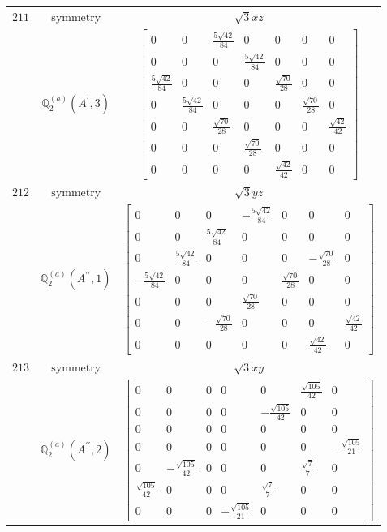 \documentclass[fleqn,8pt,landscape]{jsarticle}
\begin{document}
\begin{longtable}{ccc}
$ 211 $ & $ \text{symmetry} $ & $ \sqrt{3} x z $ \\
$  $ & $ \mathbb{Q}_{2}^{(a)}(A^{\prime},3) $ & $ \begin{bmatrix} 0 & 0 & \frac{5 \sqrt{42}}{84} & 0 & 0 & 0 & 0 \\ 0 & 0 & 0 & \frac{5 \sqrt{42}}{84} & 0 & 0 & 0 \\ \frac{5 \sqrt{42}}{84} & 0 & 0 & 0 & \frac{\sqrt{70}}{28} & 0 & 0 \\ 0 & \frac{5 \sqrt{42}}{84} & 0 & 0 & 0 & \frac{\sqrt{70}}{28} & 0 \\ 0 & 0 & \frac{\sqrt{70}}{28} & 0 & 0 & 0 & \frac{\sqrt{42}}{42} \\ 0 & 0 & 0 & \frac{\sqrt{70}}{28} & 0 & 0 & 0 \\ 0 & 0 & 0 & 0 & \frac{\sqrt{42}}{42} & 0 & 0 \end{bmatrix} $ \\ \hline
$ 212 $ & $ \text{symmetry} $ & $ \sqrt{3} y z $ \\
$  $ & $ \mathbb{Q}_{2}^{(a)}(A^{\prime\prime},1) $ & $ \begin{bmatrix} 0 & 0 & 0 & - \frac{5 \sqrt{42}}{84} & 0 & 0 & 0 \\ 0 & 0 & \frac{5 \sqrt{42}}{84} & 0 & 0 & 0 & 0 \\ 0 & \frac{5 \sqrt{42}}{84} & 0 & 0 & 0 & - \frac{\sqrt{70}}{28} & 0 \\ - \frac{5 \sqrt{42}}{84} & 0 & 0 & 0 & \frac{\sqrt{70}}{28} & 0 & 0 \\ 0 & 0 & 0 & \frac{\sqrt{70}}{28} & 0 & 0 & 0 \\ 0 & 0 & - \frac{\sqrt{70}}{28} & 0 & 0 & 0 & \frac{\sqrt{42}}{42} \\ 0 & 0 & 0 & 0 & 0 & \frac{\sqrt{42}}{42} & 0 \end{bmatrix} $ \\ \hline
$ 213 $ & $ \text{symmetry} $ & $ \sqrt{3} x y $ \\
$  $ & $ \mathbb{Q}_{2}^{(a)}(A^{\prime\prime},2) $ & $ \begin{bmatrix} 0 & 0 & 0 & 0 & 0 & \frac{\sqrt{105}}{42} & 0 \\ 0 & 0 & 0 & 0 & - \frac{\sqrt{105}}{42} & 0 & 0 \\ 0 & 0 & 0 & 0 & 0 & 0 & 0 \\ 0 & 0 & 0 & 0 & 0 & 0 & - \frac{\sqrt{105}}{21} \\ 0 & - \frac{\sqrt{105}}{42} & 0 & 0 & 0 & \frac{\sqrt{7}}{7} & 0 \\ \frac{\sqrt{105}}{42} & 0 & 0 & 0 & \frac{\sqrt{7}}{7} & 0 & 0 \\ 0 & 0 & 0 & - \frac{\sqrt{105}}{21} & 0 & 0 & 0 \end{bmatrix} $ \\ \hline

\end{longtable}
\end{document}
